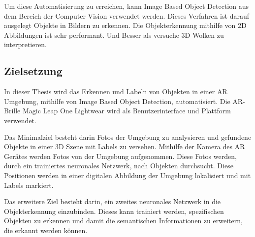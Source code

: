 Um diese Automatisierung zu erreichen, kann Image Based Object Detection aus dem Bereich der Computer Vision verwendet werden.
Dieses Verfahren ist darauf ausgelegt Objekte in Bildern zu erkennen. Die Objekterkennung mithilfe von 2D Abbildungen ist sehr performant.
Und Besser als versuche 3D Wolken zu interpretieren.\citep{introToCNN}
\subsection{Zielsetzung}

In dieser Thesis wird das Erkennen und Labeln von Objekten in einer AR Umgebung, mithilfe von Image Based Object Detection, automatisiert. 
Die AR-Brille Magic Leap One Lightwear wird als Benutzerinterface und Plattform verwendet.


Das Minimalziel besteht darin Fotos der Umgebung zu analysieren und gefundene Objekte in einer 3D Szene mit Labels zu versehen. 
Mithilfe der Kamera des AR Gerätes werden Fotos von der Umgebung aufgenommen. Diese Fotos werden, durch ein trainiertes neuronales Netzwerk, nach Objekten durchsucht. Diese Positionen werden in einer digitalen Abbildung der Umgebung lokalisiert und mit Labels markiert.

Das erweitere Ziel besteht darin, ein zweites neuronales Netzwerk in die Objekterkennung einzubinden. Dieses kann trainiert werden, spezifischen Objekten zu erkennen und damit die semantischen Informationen zu erweitern, die erkannt werden können.

